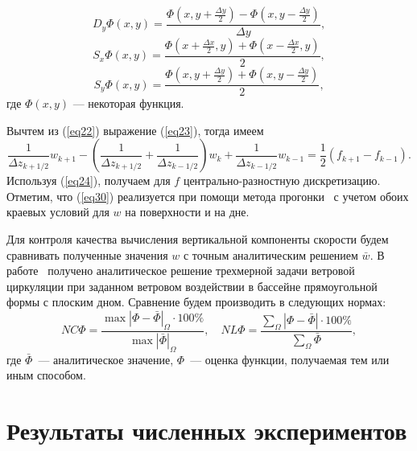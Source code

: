 \documentclass[press]{vestnik}
\begin{document}
\begin{equation}
\label{eq27}
D_{y} \Phi\left( {x,y} \right)=\frac{\Phi\left( {x,y+\frac{\Delta y}{2}} 
\right)-\Phi\left( {x,y-\frac{\Delta y}{2}} \right)}{\Delta y},
\end{equation}
\begin{equation}
\label{eq28}
S_{x} \Phi\left( {x,y} \right)=\frac{\Phi\left( {x+\frac{\Delta x}{2},y} 
\right)+\Phi\left( {x-\frac{\Delta x}{2},y} \right)}{2},
\end{equation}
\begin{equation}
\label{eq29}
S_{y} \Phi\left( {x,y} \right)=\frac{\Phi\left( {x,y+\frac{\Delta y}{2}} 
\right)+\Phi\left( {x,y-\frac{\Delta y}{2}} \right)}{2},
\end{equation}
где $\Phi\left( {x,y} \right)$ --- некоторая функция.

Вычтем из (\ref{eq22}) выражение (\ref{eq23}), тогда имеем
\begin{equation}
\label{eq30}
\frac{1}{\Delta z_{k+1/2} }w_{k+1} -\left( {\frac{1}{\Delta z_{k+1/2} 
}+\frac{1}{\Delta z_{k-1/2} }} \right)w_{k} +\frac{1}{\Delta z_{k-1/2} 
}w_{k-1} =\frac{1}{2}\left( {f_{k+1} -f_{k-1} } \right).
\end{equation}
Используя (\ref{eq24}), получаем для $f$ центрально-разностную дискретизацию. 
Отметим, что (\ref{eq30}) реализуется при помощи метода прогонки~\cite{B06} с учетом обоих 
краевых условий для $w$ на поверхности и на дне.

Для контроля качества вычисления вертикальной компоненты скорости будем 
сравнивать полученные значения $w$ с точным аналитическим решением 
$\bar{{w}}$. В работе~\cite{B03} получено аналитическое решение трехмерной задачи 
ветровой циркуляции при заданном ветровом воздействии в бассейне 
прямоугольной формы с плоским дном. Сравнение будем производить в следующих 
нормах:
\begin{equation}
\label{eq31}
NC\Phi=\frac{{\max \left| {\Phi-\bar{{\Phi}}} \right|}_{\Omega } \cdot 100\% 
}{{\max \left| {\bar{{\Phi}}} \right|}_{\Omega } },
\quad
NL\Phi=\frac{\sum\limits_\Omega {\left| {\Phi-\bar{{\Phi}}} \right|} \cdot 100\% 
}{\sum\limits_\Omega {\bar{{\Phi}}} },
\end{equation}
где $\bar{{\Phi}}$~--- аналитическое значение, $\Phi$~--- оценка функции, получаемая 
тем или иным способом.

\section{Результаты численных экспериментов}
\end{document}

